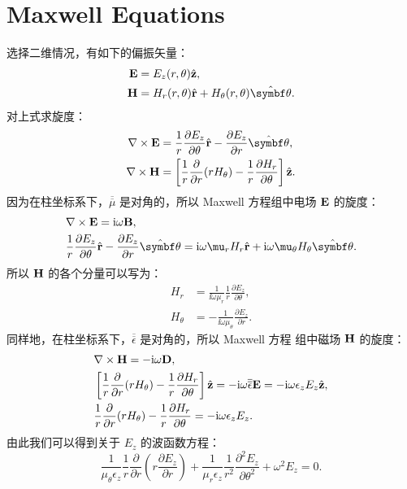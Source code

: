 ﻿%

\chapter{Maxwell Equations}

选择二维情况，有如下的偏振矢量：
\begin{subequations}
  \begin{align}
    {\bf E} &= E_z(r, \theta) \hat{\bf z}, \\
    {\bf H} &= H_r(r, \theta) \hat{\bf r} + H_\theta(r, \theta) \hat{\bm\theta}.
  \end{align}
\end{subequations}
对上式求旋度：
\begin{subequations}
  \begin{align}
    \nabla \times {\bf E} &= \frac{1}{r} \frac{\partial E_z}{\partial\theta}
      \hat{\bf r} - \frac{\partial E_z}{\partial r} \hat{\bm\theta}, \\
    \nabla \times {\bf H} &= \left[\frac{1}{r} \frac{\partial}{\partial r}
      (r H_\theta) - \frac{1}{r} \frac{\partial H_r}{\partial\theta} \right]
      \hat{\bf z}.
  \end{align}
\end{subequations}
因为在柱坐标系下，$\overline{\overline\mu}$ 是对角的，所以 Maxwell 方程组中电场
$\bf E$ 的旋度：
\begin{subequations}
  \begin{align}
    & \nabla \times {\bf E} = \ii \omega {\bf B}, \\
    & \frac{1}{r} \frac{\partial E_z}{\partial\theta} \hat{\bf r} -
      \frac{\partial E_z}{\partial r}\hat{\bm\theta} = \ii \omega \mu_r H_r
      \hat{\bf r} + \ii \omega \mu_\theta H_\theta \hat{\bm\theta}.
  \end{align}
\end{subequations}
所以 $\bf H$ 的各个分量可以写为：
\begin{subequations}
  \begin{align}
    H_r &= \frac{1}{\ii \omega \mu_r} \frac{1}{r}
      \frac{\partial E_z}{\partial\theta}, \\
    H_\theta &= -\frac{1}{\ii \omega \mu_\theta}
      \frac{\partial E_z}{\partial r}.
  \end{align}
\end{subequations}
同样地，在柱坐标系下，$\overline{\overline\epsilon}$ 是对角的，所以 Maxwell 方程
组中磁场 $\bf H$ 的旋度：
\begin{subequations}
  \begin{align}
    & \nabla \times {\bf H} = -\mathrm{i} \omega {\bf D}, \\
    & \left[\frac{1}{r} \frac{\partial}{\partial r}(r H_\theta) - \frac{1}{r}
      \frac{\partial H_r}{\partial\theta} \right] \hat{\bf z} = -\mathrm{i} \omega
      {\overline{\overline\epsilon}} {\bf E} = -\mathrm{i} \omega \epsilon_z E_z
      \hat{\bf z}, \\
    & \frac{1}{r} \frac{\partial}{\partial r}(r H_\theta) - \frac{1}{r}
      \frac{\partial H_r}{\partial\theta} = -\mathrm{i} \omega \epsilon_z E_z.
  \end{align}
\end{subequations}
由此我们可以得到关于 $E_z$ 的波函数方程：
\begin{equation}
  \frac{1}{\mu_\theta \epsilon_z} \frac{1}{r} \frac{\partial}{\partial r}
  \left(r \frac{\partial E_z}{\partial r} \right) + \frac{1}{\mu_r \epsilon_z}
  \frac{1}{r^2} \frac{\partial^2E_z}{\partial\theta^2} +\omega^2 E_z = 0.
\end{equation}
